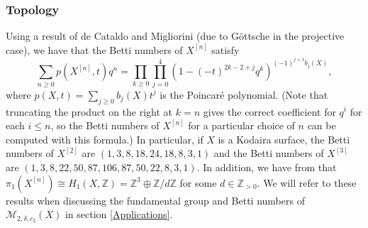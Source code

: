 \documentclass{article}[12pt]
\theoremstyle{definition}
\theoremstyle{remark}
\newcommand \Z{\mathbb Z}
\numberwithin{equation}{section}
\newcommand \mc{\mathcal}
\begin{document}
\subsubsection{Topology}
Using a result of de Cataldo and Migliorini \cite{CatMig} (due to G\"ottsche \cite{Gottsche} in the projective case), we have that the Betti numbers of $X^{[n]}$ satisfy \begin{equation}\label{gottsche}
    \sum\limits_{n\geq 0} p(X^{[n]},t)q^n=\prod\limits_{k\geq 0}\prod\limits_{j=0}^4\left(1-(-t)^{2k-2+j}q^k\right)^{(-1)^{j+1}b_j(X)}, 
\end{equation}
where $p(X,t)=\sum\limits_{j\geq 0}b_j(X)t^j$ is the Poincar\'e polynomial. (Note that truncating the product on the right at $k=n$ gives the correct coefficient for $q^i$ for each $i\leq n$, so the Betti numbers of $X^{[n]}$ for a particular choice of $n$ can be computed with this formula.) In particular, if $X$ is a Kodaira surface, the Betti numbers of $X^{[2]}$ are $(1,3,8,18,24,18,8,3,1)$ and the Betti numbers of $X^{[3]}$ are $(1,3,8,22,50,87,106,87,50,22,8,3,1).$ In addition, we have from \cite{Beau} that $\pi_1(X^{[n]})\cong H_1(X,\Z)=\Z^3\oplus \Z/d\Z$ for some $d \in \Z_{>0}$. We will refer to these results when discussing the fundamental group and Betti numbers of $\mc{M}_{2,\delta,c_2}(X)$ in section \ref{Applications}.
\end{document}
